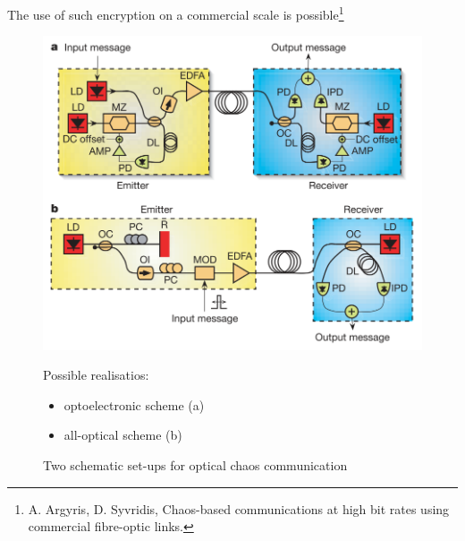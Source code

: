 The use of such encryption on a commercial scale is possible\footnote{
    \small 
    A. Argyris, D. Syvridis, Chaos-based communications at high bit rates using
    commercial fibre-optic links.
    \normalsize
} 

\begin{figure}[h]
\begin{minipage}{0.48\textwidth}
    \includegraphics[width=1\textwidth]{images/ocircuits.png}
    \caption{Two schematic set-ups for optical chaos communication}
\end{minipage}
\hfill
\begin{minipage}{0.48\textwidth}
Possible realisatios:
    \begin{itemize}
        \item optoelectronic scheme (a)
        \item all-optical scheme (b)
    \end{itemize}
\end{minipage}
\end{figure}